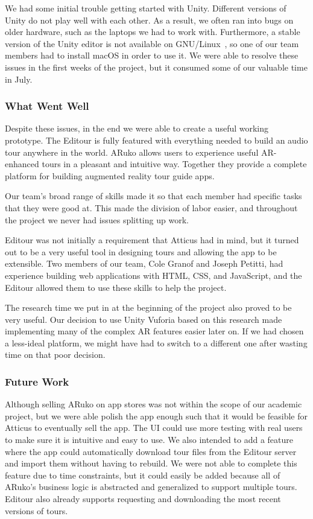 \documentclass[a4paper, 10pt, american, titlepage]{article}
\begin{document}
We had some initial trouble getting started with Unity. Different versions of
Unity do not play well with each other. As a result, we often ran into bugs on
older hardware, such as the laptops we had to work with. Furthermore, a stable
version of the Unity editor is not available on GNU/Linux~\autocite{best2019},
so one of our team members had to install macOS in order to use it. We were able
to resolve these issues in the first weeks of the project, but it consumed some
of our valuable time in July.

\subsubsection{What Went Well}
\label{sec:whatWentWell}

Despite these issues, in the end we were able to create a useful working
prototype. The Editour is fully featured with everything needed to build an
audio tour anywhere in the world. ARuko allows users to experience useful
AR-enhanced tours in a pleasant and intuitive way. Together they provide a
complete platform for building augmented reality tour guide apps.

Our team's broad range of skills made it so that each member had specific tasks
that they were good at. This made the division of labor easier, and throughout
the project we never had issues splitting up work.

Editour was not initially a requirement that Atticus had in mind, but it turned
out to be a very useful tool in designing tours and allowing the app to be
extensible. Two members of our team, Cole Granof and Joseph Petitti, had
experience building web applications with HTML, CSS, and JavaScript, and the
Editour allowed them to use these skills to help the project.

The research time we put in at the beginning of the project also proved to be
very useful. Our decision to use Unity Vuforia based on this research made
implementing many of the complex AR features easier later on. If we had chosen a
less-ideal platform, we might have had to switch to a different one after
wasting time on that poor decision.

\subsubsection{Future Work}
\label{sec:futureWork}

Although selling ARuko on app stores was not within the scope of our academic
project, but we were able polish the app enough such that it would be feasible
for Atticus to eventually sell the app. The UI could use more testing with real
users to make sure it is intuitive and easy to use. We also intended to add a
feature where the app could automatically download tour files from the Editour
server and import them without having to rebuild. We were not able to complete
this feature due to time constraints, but it could easily be added because all
of ARuko's business logic is abstracted and generalized to support multiple
tours. Editour also already supports requesting and downloading the most recent
versions of tours.
\end{document}
